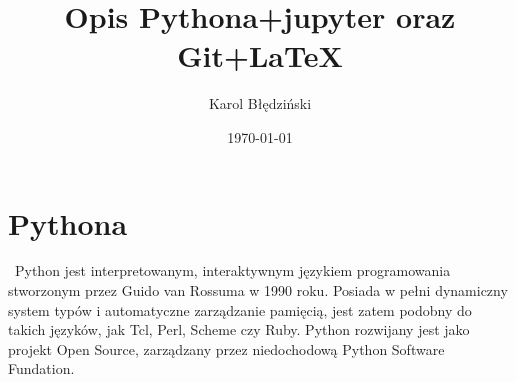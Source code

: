 \documentclass{article}
\title{Opis Pythona+jupyter oraz Git+LaTeX}
\date{\today}
\author{Karol Błędziński}
\begin{document}
  \maketitle
  \newpage
\section{Pythona}
\
  Python jest interpretowanym, interaktywnym językiem programowania stworzonym przez Guido van Rossuma w 1990 roku. Posiada w pełni dynamiczny system typów i automatyczne zarządzanie pamięcią, jest zatem podobny do takich języków, jak Tcl, Perl, Scheme czy Ruby. Python rozwijany jest jako projekt Open Source, zarządzany przez niedochodową Python Software Fundation.
\end{document}
